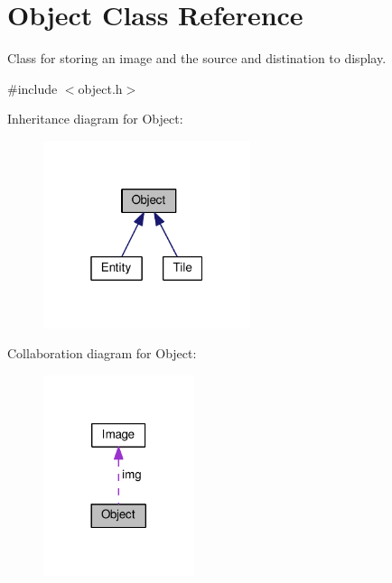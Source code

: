 \hypertarget{classObject}{}\section{Object Class Reference}
\label{classObject}


Class for storing an image and the source and distination to display.  




{\ttfamily \#include $<$object.\+h$>$}



Inheritance diagram for Object\+:\nopagebreak
\begin{figure}[H]
\begin{center}
\leavevmode
\includegraphics[width=172pt]{classObject__inherit__graph}
\end{center}
\end{figure}


Collaboration diagram for Object\+:\nopagebreak
\begin{figure}[H]
\begin{center}
\leavevmode
\includegraphics[width=125pt]{classObject__coll__graph}
\end{center}
\end{figure}
